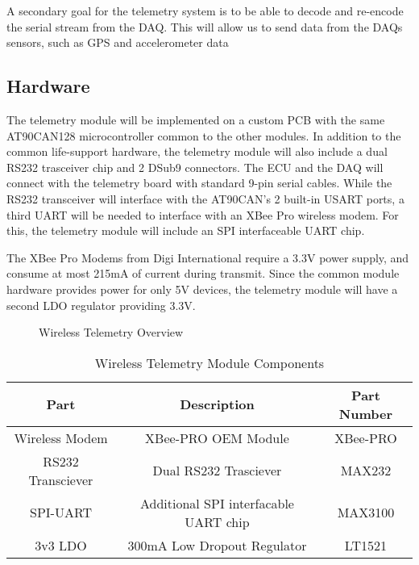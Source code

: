 A secondary goal for the telemetry system is to be able to decode and re-encode the serial stream from the DAQ. This will allow us to send data from the DAQs sensors, such as GPS and accelerometer data 

\subsection{Hardware}
The telemetry module will be implemented on a custom PCB with the same AT90CAN128 microcontroller common to the other modules. In addition to the common life-support hardware, the telemetry module will also include a dual RS232 trasceiver chip and 2 DSub9 connectors. The ECU and the DAQ will connect with the telemetry board with standard 9-pin serial cables. While the RS232 transceiver will interface with the AT90CAN's 2 built-in USART ports, a third UART will be needed to interface with an XBee Pro wireless modem. For this, the telemetry module will include an SPI interfaceable UART chip.

The XBee Pro Modems from Digi International require a 3.3V power supply, and consume at most 215mA of current during transmit. Since the common module hardware provides power for only 5V devices, the telemetry module will have a second LDO regulator providing 3.3V.

  \begin{figure}[H]
    \begin{centering}
      
    \end{centering}

    \caption{Wireless Telemetry Overview\label{fig:Wireless-Telemetry-Overview}}
  \end{figure}

  \begin{table}[H]
    \caption{Wireless Telemetry Module Components\label{tab:Wireless-Telemetry-Module}}
    \begin{centering}
      \begin{tabular}{|c|c|c|}
	\hline 
	Part & Description & Part Number\tabularnewline
	\hline
	\hline
	Wireless Modem & XBee-PRO OEM Module & XBee-PRO\tabularnewline
	\hline 
	RS232 Transciever & Dual RS232 Trasciever & MAX232\tabularnewline
	\hline 
	SPI-UART & Additional SPI interfacable UART chip &
MAX3100\tabularnewline
	\hline 
	3v3 LDO & 300mA Low Dropout Regulator & LT1521\tabularnewline
	\hline
      \end{tabular}
    \end{centering}
  \end{table}

